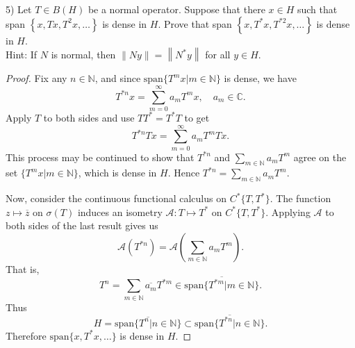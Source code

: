 \begin{problem}
	5) Let $T \in B(H)$ be a normal operator. Suppose that there $x \in H$ such that span $\left\{x, T x, T^2 x, \ldots\right\}$ is dense in $H$. Prove that span $\left\{x, T^* x, T^{* 2} x, \ldots\right\}$ is dense in $H$.\\
Hint: If $N$ is normal, then $\|N y\|=\left\|N^* y\right\|$ for all $y \in H$.
\end{problem}
\begin{proof}
	Fix any $n \in \mathbb{N}$, and since $\text{span}\{T^{m} x | m \in \mathbb{N}\} $ is dense, we have 
	\[
		T^{* n}x = \sum_{m = 0}^\infty a_m T^m x, \quad a_m \in \mathbb{C}
	.\] 
	Apply $T$ to both sides and use $TT^* = T^* T$ to get
	\[
		T^{* n} Tx = \sum_{m = 0}^\infty a_m T^m T x
	.\] 
	This process may be continued to show that $T^{* n}$ and $\sum_{m \in \mathbb{N}} a_m T^m$ agree on the set $\{T^m x | m \in \mathbb{N}\} $, which is dense in $H$. Hence $T^{* n} = \sum_{m \in \mathbb{N}}a_m T^m$.

	Now, consider the continuous functional calculus on $C^*\{T, T^*\} $. The function $z \mapsto \overline{z} $ on $\sigma(T)$ induces an isometry $\mathcal{A}:T \mapsto T^*$ on $C^*\{T, T^*\} $. Applying $\mathcal{A}$ to both sides of the last result gives us
	\[
		\mathcal{A} (T^{* n}) = \mathcal{A} \left( \sum_{m \in \mathbb{N}} a_m T^m \right) 
	.\] 
	That is,
	\[
		T^n = \sum_{m \in \mathbb{N}} \overline{a_m}  T^{* m} \in \overline{\text{span}\{T^{* m}| m \in \mathbb{N}\} } 
	.\] 
	Thus
	\[
		H = \overline{\text{span}\{T^n | n \in \mathbb{N}\} } 
		\subset 
		\overline{\text{span}\{T^{* n} | n \in \mathbb{N}\} } .\] 
		Therefore $\text{span}\{x, T^*x, \ldots\} $ is dense in $H$.
	\end{proof}

